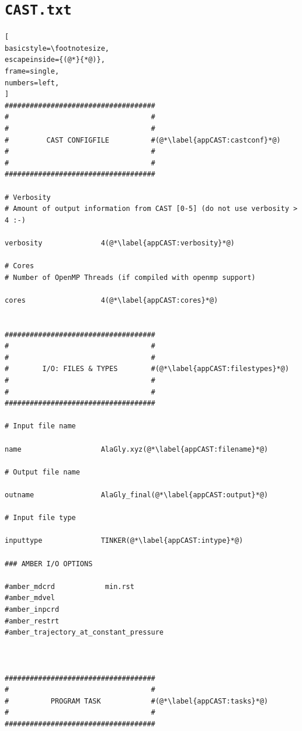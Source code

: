 \documentclass[a4paper,11pt]{scrartcl}
\begin{document}
\section{\texttt{CAST.txt}}
\label{app:casttxt}

\begin{lstlisting}[
basicstyle=\footnotesize,
escapeinside={(@*}{*@)},
frame=single,
numbers=left,
]
####################################
#                                  #
#                                  #
#         CAST CONFIGFILE          #(@*\label{appCAST:castconf}*@)
#                                  #
#                                  #
#################################### 

# Verbosity 
# Amount of output information from CAST [0-5] (do not use verbosity > 4 :-)

verbosity              4(@*\label{appCAST:verbosity}*@)

# Cores
# Number of OpenMP Threads (if compiled with openmp support)

cores                  4(@*\label{appCAST:cores}*@)


####################################
#                                  #
#                                  #
#        I/O: FILES & TYPES        #(@*\label{appCAST:filestypes}*@)
#                                  #
#                                  #
####################################

# Input file name

name                   AlaGly.xyz(@*\label{appCAST:filename}*@)

# Output file name

outname                AlaGly_final(@*\label{appCAST:output}*@)

# Input file type

inputtype              TINKER(@*\label{appCAST:intype}*@)

### AMBER I/O OPTIONS

#amber_mdcrd            min.rst
#amber_mdvel
#amber_inpcrd
#amber_restrt
#amber_trajectory_at_constant_pressure



#################################### 
#                                  #
#          PROGRAM TASK            #(@*\label{appCAST:tasks}*@)
#                                  #
####################################


\end{lstlisting}
\end{document}
